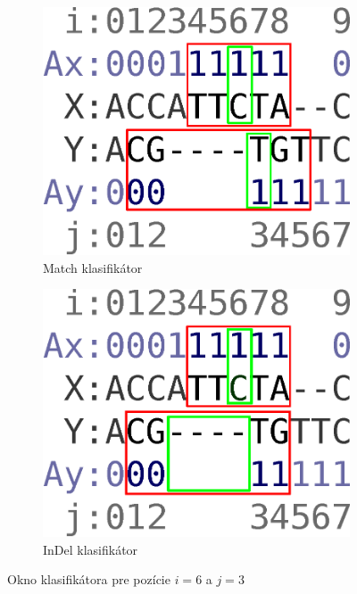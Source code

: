 \begin{figure}[h]
        \centering
        \begin{subfigure}[b]{0.35\textwidth}
                \includegraphics[width=\textwidth]{images/window_m}
                \caption{Match klasifikátor}
                \label{fig:window-m}
        \end{subfigure}%
        \qquad\qquad %
        \begin{subfigure}[b]{0.35\textwidth}
                \includegraphics[width=\textwidth]{images/window_i}
                \caption{InDel klasifikátor}
                \label{fig:window-i}
        \end{subfigure}
        \caption[Okno klasifikátora]{Okno klasifikátora pre pozície $i = 6$ a $j = 3$}
\end{figure}

